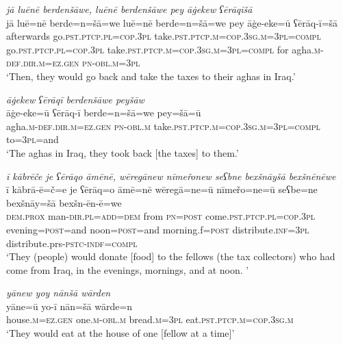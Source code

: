 \ea \label{BP.27}
\textit{jā luēnē berdenšāwe, luēnē berdenšāwe pey āġekew ʕērāqīšā} \\ 
\gll jā luē=nē berde=n=šā=we luē=nē berde=n=šā=we pey āġe-eke=ū ʕērāq-ī=šā \\ 
 afterwards go\textsc{.pst}\textsc{.ptcp}\textsc{.pl}\textsc{=cop}\textsc{.3pl} take\textsc{.pst}\textsc{.ptcp}\textsc{.m}\textsc{=cop}\textsc{.3sg}\textsc{.m}\textsc{=3pl}\textsc{=compl} go\textsc{.pst}\textsc{.ptcp}\textsc{.pl}\textsc{=cop}\textsc{.3pl} take\textsc{.pst}\textsc{.ptcp}\textsc{.m}\textsc{=cop}\textsc{.3sg}\textsc{.m}\textsc{=3pl}\textsc{=compl} for agha\textsc{.m}\textsc{-def}\textsc{.dir}\textsc{.m}\textsc{=ez.gen} \textsc{pn}\textsc{-obl}\textsc{.m}\textsc{=3pl} \\ 
\glt `Then, they would go back and take the taxes to their aghas in Iraq.'
\z 
 
\ea \label{BP.28}
\textit{āġekew ʕērāqī berdenšāwe peyšāw} \\ 
\gll āġe-eke=ū ʕērāq-ī berde=n=šā=we pey=šā=ū \\ 
 agha\textsc{.m}\textsc{-def}\textsc{.dir}\textsc{.m}\textsc{=ez.gen} \textsc{pn}\textsc{-obl}\textsc{.m} take\textsc{.pst}\textsc{.ptcp}\textsc{.m}\textsc{=cop}\textsc{.3sg}\textsc{.m}\textsc{=3pl}\textsc{=compl} to\textsc{=3pl}=and \\ 
\glt `The aghas in Iraq, they took back [the taxes] to them.'
\z 
 
\ea \label{BP.38}
\textit{ī kābrēče je ʕērāqo āmēnē, wēregānew nīmeřonew seʕbne bexšnāyšā bexšnēnēwe} \\ 
\gll ī kābrā-ē=č=e je ʕērāq=o āmē=nē wēregā=ne=ū nīmeřo=ne=ū seʕbe=ne bexšnāy=šā bexšn-ēn-ē=we \\ 
 \textsc{dem.prox} man\textsc{-dir}\textsc{.pl}\textsc{=add}\textsc{=dem} from \textsc{pn}\textsc{=\textsc{post}} come\textsc{.pst}\textsc{.ptcp}\textsc{.pl}\textsc{=cop}\textsc{.3pl} evening\textsc{=\textsc{post}}=and noon\textsc{=\textsc{post}}=and morning.f\textsc{=\textsc{post}} distribute\textsc{.inf}\textsc{=3pl} distribute.prs\textsc{-pstc}\textsc{-indf}\textsc{=compl} \\ 
\glt `They (people) would donate [food] to the fellows (the tax collectors) who had come from Iraq, in the evenings, mornings, and at noon. '
\z 
 
\ea \label{BP.39}
\textit{yānew yoy nānšā wārden} \\ 
\gll yāne=ū yo-ī nān=šā wārde=n \\ 
 house\textsc{.m}\textsc{=ez.gen} one\textsc{.m}\textsc{-obl}\textsc{.m} bread\textsc{.m}\textsc{=3pl} eat\textsc{.pst}\textsc{.ptcp}\textsc{.m}\textsc{=cop}\textsc{.3sg}\textsc{.m} \\ 
\glt `They would eat at the house of one [fellow at a time]'
\z 
 
